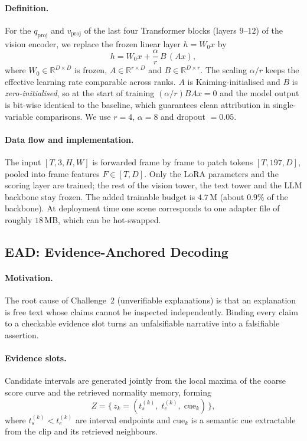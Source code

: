 \paragraph{Definition.} For the $q_{\text{proj}}$ and $v_{\text{proj}}$ of the last four Transformer blocks (layers $9$--$12$) of the vision encoder, we replace the frozen linear layer $h = W_0 x$ by
\begin{equation}
h = W_0 x + \frac{\alpha}{r}\, B\,(A x),
\end{equation}
where $W_0 \in \mathbb{R}^{D \times D}$ is frozen, $A \in \mathbb{R}^{r \times D}$ and $B \in \mathbb{R}^{D \times r}$. The scaling $\alpha/r$ keeps the effective learning rate comparable across ranks. $A$ is Kaiming-initialised and $B$ is \emph{zero-initialised}, so at the start of training $({\alpha}/{r}) B A x = 0$ and the model output is bit-wise identical to the baseline, which guarantees clean attribution in single-variable comparisons. We use $r{=}4$, $\alpha{=}8$ and dropout $=0.05$.

\paragraph{Data flow and implementation.} The input $[T,3,H,W]$ is forwarded frame by frame to patch tokens $[T,197,D]$, pooled into frame features $F \in [T,D]$. Only the LoRA parameters and the scoring layer are trained; the rest of the vision tower, the text tower and the LLM backbone stay frozen. The added trainable budget is $4.7$\,M (about $0.9\%$ of the backbone). At deployment time one scene corresponds to one adapter file of roughly $18$\,MB, which can be hot-swapped.

\subsection{EAD: Evidence-Anchored Decoding}

\paragraph{Motivation.} The root cause of Challenge~2 (unverifiable explanations) is that an explanation is free text whose claims cannot be inspected independently. Binding every claim to a checkable evidence slot turns an unfalsifiable narrative into a falsifiable assertion.

\paragraph{Evidence slots.} Candidate intervals are generated jointly from the local maxima of the coarse score curve and the retrieved normality memory, forming
\begin{equation}
Z = \{\, z_k = (t_s^{(k)},\; t_e^{(k)},\; \mathrm{cue}_k) \,\},
\end{equation}
where $t_s^{(k)} < t_e^{(k)}$ are interval endpoints and $\mathrm{cue}_k$ is a semantic cue extractable from the clip and its retrieved neighbours.

